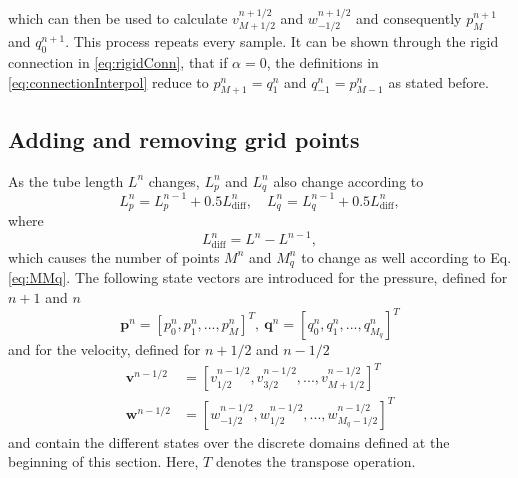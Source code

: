 which can then be used to calculate $v_{M+1/2}^{n+1/2}$ and $w_{-1/2}^{n+1/2}$ and consequently $p_M^{n+1}$ and $q_0^{n+1}$. This process repeats every sample. It can be shown through the rigid connection in \eqref{eq:rigidConn}, that if $\alpha=0$, the definitions in \eqref{eq:connectionInterpol} reduce to $p_{M+1}^n = q_1^n$ and $q_{-1}^n = p_{M-1}^n$ as stated before.

\subsection{Adding and removing grid points}\label{sec:addRemove}
As the tube length $L^n$ changes, $L_p^n$ and $L_q^n$ also change according to
\begin{equation}
    L_p^n = L_p^{n-1} + 0.5 L_\text{diff}^n, \quad L_q^n =  L_q^{n-1} + 0.5L_\text{diff}^n,\label{eq:updateLs} 
\end{equation}
where
\begin{equation}
    L_\text{diff}^n = L^n-L^{n-1},\label{eq:lDiff}
\end{equation}
which causes the number of points $M^n$ and $M_q^n$ to change as well according to Eq. \eqref{eq:MMq}. The following state vectors are introduced for the pressure, defined for $n+1$ and $n$ 
\begin{equation}
    \mathbf{p}^n = [p_0^n, p_1^n, ..., p_M^n]^T,\ \mathbf{q}^n = [q_0^n, q_1^n, ..., q_{M_q}^n]^T
\end{equation}
and for the velocity, defined for $n+1/2$ and $n-1/2$
\begin{equation}
    \begin{aligned}
        \mathbf{v}^{n-1/2} &=  [v_{1/2}^{n-1/2}, v_{3/2}^{n-1/2}, ..., v_{M+1/2}^{n-1/2}]^T\\
        \mathbf{w}^{n-1/2} &=  [w_{-1/2}^{n-1/2}, w_{1/2}^{n-1/2}, ..., w_{M_q-1/2}^{n-1/2}]^T
    \end{aligned}
\end{equation}
and contain the different states over the discrete domains defined at the beginning of this section. Here, $T$ denotes the transpose operation.

